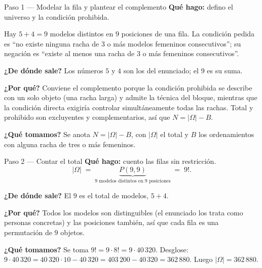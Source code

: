\documentclass[11pt]{article}
\begin{document}
\begin{paso}{Paso 1 --- Modelar la fila y plantear el complemento}
\textbf{Qué hago:} defino el universo y la condición prohibida.

Hay $5+4=9$ modelos distintos en $9$ posiciones de una fila. La condición pedida es ``no existe ninguna racha de $3$ o más modelos femeninos consecutivos''; su negación es ``existe al menos una racha de $3$ o más femeninos consecutivos''.

\textbf{¿De dónde sale?} Los números $5$ y $4$ son los del enunciado; el $9$ es su suma.

\textbf{¿Por qué?} Conviene el complemento porque la condición prohibida se describe con un solo objeto (una racha larga) y admite la técnica del bloque, mientras que la condición directa exigiría controlar simultáneamente todas las rachas. Total y prohibido son excluyentes y complementarios, así que $N=|\Omega|-B$.

\textbf{¿Qué tomamos?} Se anota $N = |\Omega| - B$, con $|\Omega|$ el total y $B$ los ordenamientos con alguna racha de tres o más femeninos.
\end{paso}

\begin{paso}{Paso 2 --- Contar el total}
\textbf{Qué hago:} cuento las filas sin restricción.
\[
  |\Omega| \;=\; \underbrace{P(9,9)}_{\text{9 modelos distintos en 9 posiciones}} \;=\; 9! .
\]

\textbf{¿De dónde sale?} El $9$ es el total de modelos, $5+4$.

\textbf{¿Por qué?} Todos los modelos son distinguibles (el enunciado los trata como personas concretas) y las posiciones también, así que cada fila es una permutación de $9$ objetos.

\textbf{¿Qué tomamos?} Se toma $9! = 9\cdot 8!= 9\cdot 40\,320$. Desglose: $9\cdot 40\,320 = 40\,320\cdot 10 - 40\,320 = 403\,200-40\,320 = 362\,880$. Luego $|\Omega|=362\,880$.
\end{paso}
\end{document}
